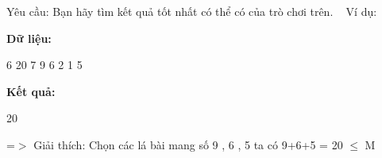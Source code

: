 Yêu cầu: Bạn hãy tìm kết quả tốt nhất có thể có của trò chơi trên.
 
Ví dụ:
 

\textbf{Dữ liệu: }

6 20 7 9 6 2 1 5

\textbf{Kết quả: }

20

=$>$ Giải thích: Chọn các lá bài mang số 9 , 6 , 5 ta có 9+6+5 = 20  $\le$  M
